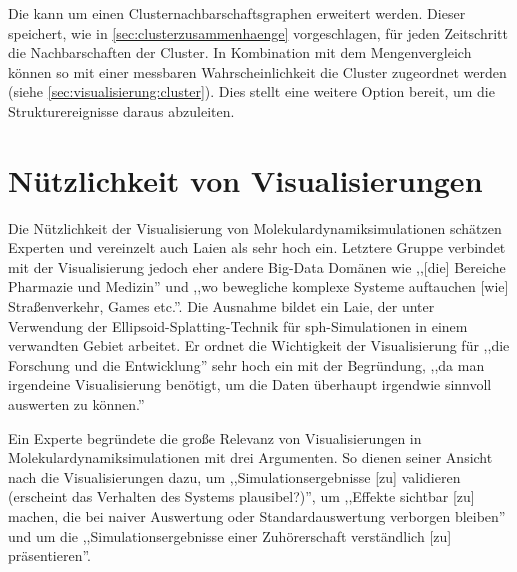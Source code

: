 Die \SECC kann um einen Clusternachbarschaftsgraphen erweitert werden. Dieser speichert, wie in \autoref{sec:clusterzusammenhaenge} vorgeschlagen, für jeden Zeitschritt die Nachbarschaften der Cluster. In Kombination mit dem Mengenvergleich können so mit einer messbaren Wahrscheinlichkeit die Cluster zugeordnet werden (siehe \autoref{sec:visualisierung:cluster}). %
Dies stellt eine weitere Option bereit, um die Strukturereignisse daraus abzuleiten.

\section{Nützlichkeit von Visualisierungen}
Die Nützlichkeit der Visualisierung von Molekulardynamiksimulationen schätzen Experten und vereinzelt auch Laien als sehr hoch ein. Letztere Gruppe verbindet mit der Visualisierung jedoch eher andere Big-Data Domänen wie ,,[die] Bereiche Pharmazie und Medizin'' und ,,wo bewegliche komplexe Systeme auftauchen [wie] Straßenverkehr, Games etc.''. Die Ausnahme bildet ein Laie, der unter Verwendung der Ellipsoid-Splatting-Technik für \gls{sph}-Simulationen in einem verwandten Gebiet arbeitet. Er ordnet die Wichtigkeit der Visualisierung für ,,die Forschung und die Entwicklung'' sehr hoch ein mit der Begründung, ,,da man irgendeine Visualisierung benötigt, um die Daten überhaupt irgendwie sinnvoll auswerten zu können.''

Ein Experte begründete die große Relevanz von Visualisierungen in Molekulardynamiksimulationen mit drei Argumenten. So dienen seiner Ansicht nach die Visualisierungen dazu, um ,,Simulationsergebnisse [zu] validieren (erscheint das Verhalten des Systems plausibel?)'', um ,,Effekte sichtbar [zu] machen, die bei naiver Auswertung oder Standardauswertung verborgen bleiben'' und um die ,,Simulationsergebnisse einer Zuhörerschaft verständlich [zu] präsentieren''.


